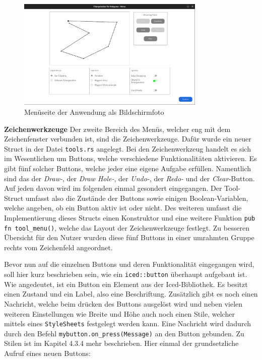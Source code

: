 \begin{figure}[h]
    \centering
    \includegraphics[width=0.8\textwidth]{bilder/menu.png}
    \caption[Menüseite der Anwendung]{Menüseite der Anwendung als Bildschirmfoto}
    
\end{figure}

\textbf{Zeichenwerkzeuge}\linebreak
Der zweite Bereich des Menüs, welcher eng mit dem Zeichenfenster verbunden ist, sind die Zeichenwerkzeuge. Dafür wurde ein neuer Struct in der Datei \lstinline{tools.rs} angelegt.  Bei den Zeichenwerkzeug handelt es sich im Wesentlichen um Buttons, welche verschiedene Funktionalitäten aktivieren.
Es gibt fünf solcher Buttons, welche jeder eine eigene Aufgabe erfüllen. Namentlich sind das der \emph{Draw-}, der \emph{Draw Hole-}, der \emph{Undo-}, der \emph{Redo-} und der \emph{Clear-}Button. Auf jeden davon wird im folgenden einmal gesondert eingegangen.
Der Tool-Struct umfasst also die Zustände der Buttons sowie einigen Boolean-Variablen, welche angeben, ob ein Button aktiv ist oder nicht. Des weiteren umfasst die Implementierung dieses Structs einen Konstruktor und eine weitere Funktion \lstinline{pub fn tool_menu()}, welche das Layout der Zeichenwerkzeuge festlegt.
Zu besseren Übersicht für den Nutzer wurden diese fünf Buttons in einer umrahmten Gruppe rechts vom Zeichenfeld angeordnet.

Bevor nun auf die einzelnen Buttons und deren Funktionalität eingegangen wird, soll hier kurz beschrieben sein, wie ein \lstinline{iced::button} überhaupt aufgebaut ist. 
Wie angedeutet, ist ein Button ein Element aus der Iced-Bibliothek. Es besitzt einen Zustand und ein Label, also eine Beschriftung. Zusätzlich gibt es noch einen Nachricht, welche beim drücken des Buttons ausgelöst wird und neben vielen weiteren Einstellungen wie Breite und Höhe auch noch einen 
Stile, welcher mittels eines \lstinline{StyleSheets} festgelegt werden kann. Eine Nachricht wird dadurch durch den Befehl \lstinline{mybutton.on_press(Message)} an den Button gebunden. 
Zu Stilen ist im Kapitel 4.3.4 mehr beschrieben. Hier einmal der grundsetzliche Aufruf eines neuen Buttons:


